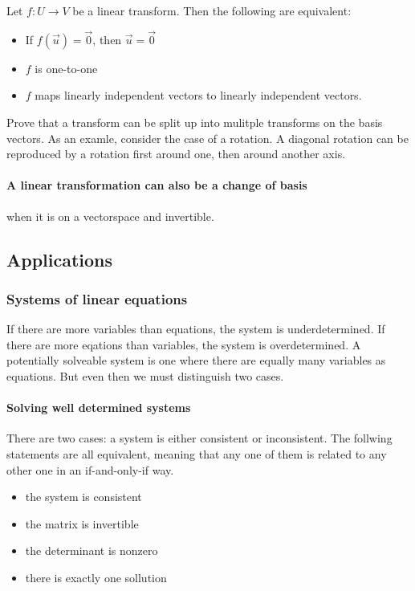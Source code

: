 Let $f: U \to V$ be a linear transform. Then the following are equivalent: 
\begin{itemize}
    \item If $f(\vec{u}) = \vec{0}$, then $\vec{u} = \vec{0}$
    \item $f$ is one-to-one
    \item $f$ maps linearly independent vectors to linearly independent vectors. 
\end{itemize}


Prove that a transform can be split up into mulitple transforms on the basis vectors. 
As an examle, consider the case of a rotation. A diagonal rotation can be reproduced by a rotation first around one, then around another axis. 


\paragraph{A linear transformation can also be a change of basis} when it is on a vectorspace and invertible.














\subsection{Applications}


\subsubsection{Systems of linear equations}
If there are more variables than equations, the system is underdetermined. If there are more eqations than variables, the system is overdetermined. A potentially solveable system is one where there are equally many variables as equations. But even then we must distinguish two cases. 

\paragraph{Solving well determined systems}
There are two cases: a system is either consistent or inconsistent. The follwing statements are all equivalent, meaning that any one of them is related to any other one in an if-and-only-if way. 

\begin{itemize}
    \item the system is consistent
    \item the matrix is invertible
    \item the determinant is nonzero
    \item there is exactly one sollution
\end{itemize}

